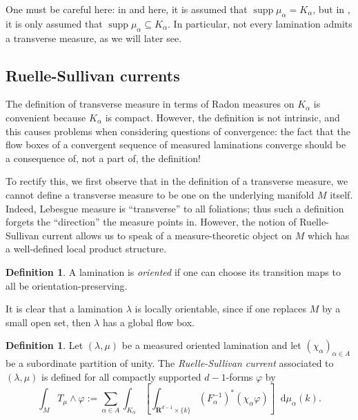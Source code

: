 \documentclass[reqno,11pt]{amsart}
\newcommand{\RR}{\mathbf{R}}
\newcommand*\dif{\mathop{}\!\mathrm{d}}
\DeclareMathOperator{\supp}{supp}
\newcommand{\dfn}[1]{\emph{#1}\index{#1}}
\theoremstyle{definition}
\newtheorem{definition}[theorem]{Definition}
\numberwithin{equation}{section}
\begin{document}
One must be careful here: in \cite{thurston1979geometry} and here, it is assumed that $\supp \mu_\alpha = K_\alpha$, but in \cite{daskalopoulos2020transverse}, it is only assumed that $\supp \mu_\alpha \subseteq K_\alpha$.
In particular, not every lamination admits a transverse measure, as we will later see.


\subsection{Ruelle-Sullivan currents}
The definition of transverse measure in terms of Radon measures on $K_\alpha$ is convenient because $K_\alpha$ is compact.
However, the definition is not intrinsic, and this causes problems when considering questions of convergence: the fact that the flow boxes of a convergent sequence of measured laminations converge should be a consequence of, not a part of, the definition!

To rectify this, we first observe that in the definition of a transverse measure, we cannot define a transverse measure to be one on the underlying manifold $M$ itself.
Indeed, Lebesgue measure is ``transverse'' to all foliations; thus such a definition forgets the ``direction'' the measure points in.
However, the notion of Ruelle-Sullivan current allows us to speak of a measure-theoretic object on $M$ which has a well-defined local product structure.

\begin{definition}
A lamination is \dfn{oriented} if one can choose its transition maps to all be orientation-preserving.
\end{definition}

It is clear that a lamination $\lambda$ is locally orientable, since if one replaces $M$ by a small open set, then $\lambda$ has a global flow box.

\begin{definition}
Let $(\lambda, \mu)$ be a measured oriented lamination and let $(\chi_\alpha)_{\alpha \in A}$ be a subordinate partition of unity.
The \dfn{Ruelle-Sullivan current} associated to $(\lambda, \mu)$ is defined for all compactly supported $d-1$-forms $\varphi$ by
\begin{equation}\label{RS current}
\int_M T_\mu \wedge \varphi := \sum_{\alpha \in A} \int_{K_\alpha} \left[\int_{\RR^{d - 1} \times \{k\}} (F_\alpha^{-1})^* (\chi_\alpha \varphi) \right] \dif \mu_\alpha(k).
\end{equation}
\end{definition}
\end{document}
